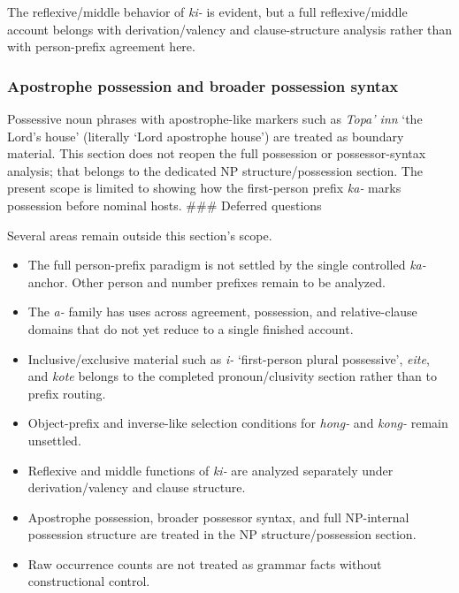\documentclass[
  11pt,
  a4paper,
]{article}
\providecommand{\tightlist}{%
  \setlength{\itemsep}{0pt}\setlength{\parskip}{0pt}}
\newcommand{\tdim}[1]{\textit{#1}}
\newcommand{\glossquote}[1]{`#1'}
\begin{document}
The reflexive/middle behavior of \tdim{ki-} is evident, but a full
reflexive/middle account belongs with derivation/valency and
clause-structure analysis rather than with person-prefix agreement here.

\subsubsection{Apostrophe possession and broader possession
syntax}\label{apostrophe-possession-and-broader-possession-syntax}

Possessive noun phrases with apostrophe-like markers such as
\tdim{Topa' inn} \glossquote{the Lord's house} (literally
\glossquote{Lord apostrophe house}) are treated as boundary material.
This section does not reopen the full possession or possessor-syntax
analysis; that belongs to the dedicated NP structure/possession section.
The present scope is limited to showing how the first-person prefix
\tdim{ka-} marks possession before nominal hosts. \#\#\# Deferred
questions

Several areas remain outside this section's scope.

\begin{itemize}
\tightlist
\item
  The full person-prefix paradigm is not settled by the single
  controlled \tdim{ka-} anchor. Other person and number prefixes remain
  to be analyzed.
\item
  The \tdim{a-} family has uses across agreement, possession, and
  relative-clause domains that do not yet reduce to a single finished
  account.
\item
  Inclusive/exclusive material such as \tdim{i-}
  \glossquote{first-person plural possessive}, \tdim{eite}, and
  \tdim{kote} belongs to the completed pronoun/clusivity section rather
  than to prefix routing.
\item
  Object-prefix and inverse-like selection conditions for \tdim{hong-}
  and \tdim{kong-} remain unsettled.
\item
  Reflexive and middle functions of \tdim{ki-} are analyzed separately
  under derivation/valency and clause structure.
\item
  Apostrophe possession, broader possessor syntax, and full NP-internal
  possession structure are treated in the NP structure/possession
  section.
\item
  Raw occurrence counts are not treated as grammar facts without
  constructional control.
\end{itemize}
\end{document}
